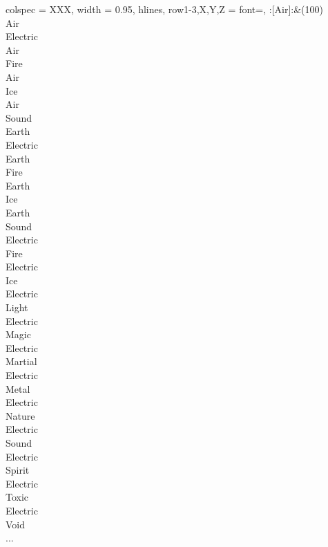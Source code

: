 \twocolumn
\begin{longtblr}[
	caption = {2v1 Defending Weak},
	label = {2v1-Defending-Weak},
]{
	colspec = {XXX}, width = 0.95\linewidth,
	hlines,
	row{1-3,X,Y,Z} = {font=\bfseries},
}
	:[Air]:&{(100)\\
	Air \\
	Electric \\
	Air \\
	Fire \\
	Air \\
	Ice \\
	Air \\
	Sound \\
	Earth \\
	Electric \\
	Earth \\
	Fire \\
	Earth \\
	Ice \\
	Earth \\
	Sound \\
	Electric \\
	Fire \\
	Electric \\
	Ice \\
	Electric \\
	Light \\
	Electric \\
	Magic \\
	Electric \\
	Martial \\
	Electric \\
	Metal \\
	Electric \\
	Nature \\
	Electric \\
	Sound \\
	Electric \\
	Spirit \\
	Electric \\
	Toxic \\
	Electric \\
	Void \\
	...\\
	}\\


\end{longtblr}
